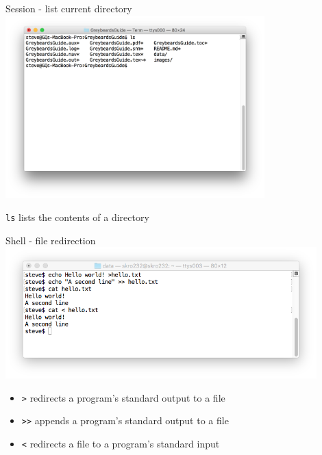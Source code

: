 \documentclass[t]{beamer}
\begin{document}
\begin{frame}{Session - list current directory}
  \includegraphics[width=10cm,scale=0.4]{images/newtty-2.png}

  \texttt{ls} lists the contents of a directory
  \note{}
\end{frame}

\begin{frame}{Shell - file redirection}
  \includegraphics[width=12cm,scale=0.4]{images/file-redir.png}
  \begin{itemize}
  \item \texttt{>} redirects a program's standard output to a file
  \item \texttt{>>} appends a program's standard output to a file
  \item \texttt{<} redirects a file to a program's standard input 
  \end{itemize}
  \note{
       }
\end{frame}
\end{document}
